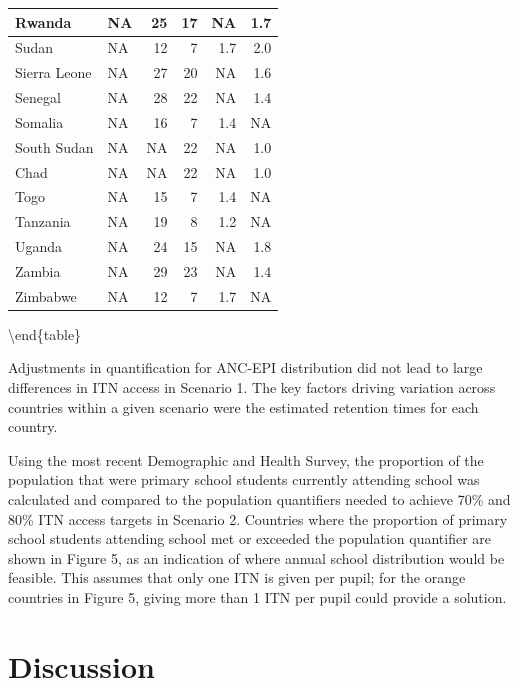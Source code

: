 \documentclass[review,
3p]{elsarticle} %
\begin{document}
\begin{tabular}[t]{l|l|r|r|r|r}
\hline
Rwanda & NA & 25 & 17 & NA & 1.7\\
\hline
Sudan & NA & 12 & 7 & 1.7 & 2.0\\
\hline
Sierra Leone & NA & 27 & 20 & NA & 1.6\\
\hline
Senegal & NA & 28 & 22 & NA & 1.4\\
\hline
Somalia & NA & 16 & 7 & 1.4 & NA\\
\hline
South Sudan & NA & NA & 22 & NA & 1.0\\
\hline
Chad & NA & NA & 22 & NA & 1.0\\
\hline
Togo & NA & 15 & 7 & 1.4 & NA\\
\hline
Tanzania & NA & 19 & 8 & 1.2 & NA\\
\hline
Uganda & NA & 24 & 15 & NA & 1.8\\
\hline
Zambia & NA & 29 & 23 & NA & 1.4\\
\hline
Zimbabwe & NA & 12 & 7 & 1.7 & NA\\
\hline
\end{tabular}

\textbackslash end\{table\}

Adjustments in quantification for ANC-EPI distribution did not lead to
large differences in ITN access in Scenario 1. The key factors driving
variation across countries within a given scenario were the estimated
retention times for each country.

Using the most recent Demographic and Health Survey, the proportion of
the population that were primary school students currently attending
school was calculated and compared to the population quantifiers needed
to achieve 70\% and 80\% ITN access targets in Scenario 2. Countries
where the proportion of primary school students attending school met or
exceeded the population quantifier are shown in Figure 5, as an
indication of where annual school distribution would be feasible. This
assumes that only one ITN is given per pupil; for the orange countries
in Figure 5, giving more than 1 ITN per pupil could provide a solution.

\hypertarget{discussion}{%
\section{Discussion}\label{discussion}}
\end{document}
